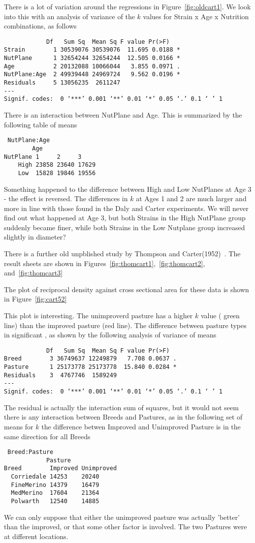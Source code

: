 \documentclass[titlepage]{article}  %
\begin{document}
There is a lot of variation around the regressions in Figure~\ref{fig:oldcart1}. We look into this with an analysis of variance of the $k$ values for Strain x Age x Nutrition combinations, as follows
\begin{verbatim}
            Df   Sum Sq  Mean Sq F value Pr(>F)  
Strain        1 30539076 30539076  11.695 0.0188 *
NutPlane      1 32654244 32654244  12.505 0.0166 *
Age           2 20132088 10066044   3.855 0.0971 .
NutPlane:Age  2 49939448 24969724   9.562 0.0196 *
Residuals     5 13056235  2611247                 
---
Signif. codes:  0 ‘***’ 0.001 ‘**’ 0.01 ‘*’ 0.05 ‘.’ 0.1 ‘ ’ 1
\end{verbatim}
There is an interaction between NutPlane and Age.  This is summarized by the following table of means
\begin{verbatim}
 NutPlane:Age 
        Age
NutPlane 1     2     3    
    High 23858 23640 17629
    Low  15828 19846 19556
\end{verbatim}
Something happened to the difference between High and Low NutPlanes at Age 3 - the effect is reversed. The differences in $k$ at Ages 1 and 2 are much larger and more in line with those found in the Daly and Carter experiments. 
 We will never find out what happened at Age 3, but both Strains in the High NutPlane group suddenly became finer, while both Strains in the Low Nutplane group increased slightly in diameter? 

There is a further old unpblished study by Thompson and Carter(1952)~\cite{thom:52}. The result sheets are shown in Figures~\ref{fig:thomcart1},~\ref{fig:thomcart2}, and~\ref{fig:thomcart3}



The plot of reciprocal density against cross sectional area for these data is shown in Figure~\ref{fig:cart52}

This plot is interesting. The unimproverd pasture has a higher $k$ value ( green line) than the improved pasture (red line). The difference between pasture types in significant , as shown by the following analysis of variance of means
\begin{verbatim}
            Df   Sum Sq  Mean Sq F value Pr(>F)
Breed        3 36749637 12249879   7.708 0.0637 .
Pasture      1 25173778 25173778  15.840 0.0284 *
Residuals    3  4767746  1589249
---
Signif. codes:  0 ‘***’ 0.001 ‘**’ 0.01 ‘*’ 0.05 ‘.’ 0.1 ‘ ’ 1
\end{verbatim}
The residual is actually the interaction sum of squares, but it would not seem there is any interaction between Breeds and Pastures, as in the following set of  means for $k$ the difference betwen Improved and Unimproved Pasture is in the same direction for all Breeds
\begin{verbatim}
 Breed:Pasture
            Pasture
Breed        Improved Unimproved
  Corriedale 14253    20240
  FineMerino 14379    16479
  MedMerino  17604    21364
  Polwarth   12540    14885
\end{verbatim}
We can only suppose that either the unimproved pasture was actually 'better' than the improved, or that some other factor is involved. The two Pastures were at different locations.
\end{document}
